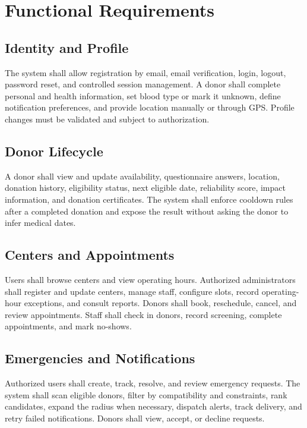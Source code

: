 \section{Functional Requirements}


\subsection{Identity and Profile}
The system shall allow registration by email, email verification, login, logout, password reset, and controlled session management. A donor shall complete personal and health information, set blood type or mark it unknown, define notification preferences, and provide location manually or through GPS. Profile changes must be validated and subject to authorization.

\subsection{Donor Lifecycle}
A donor shall view and update availability, questionnaire answers, location, donation history, eligibility status, next eligible date, reliability score, impact information, and donation certificates. The system shall enforce cooldown rules after a completed donation and expose the result without asking the donor to infer medical dates.

\subsection{Centers and Appointments}
Users shall browse centers and view operating hours. Authorized administrators shall register and update centers, manage staff, configure slots, record operating-hour exceptions, and consult reports. Donors shall book, reschedule, cancel, and review appointments. Staff shall check in donors, record screening, complete appointments, and mark no-shows.

\subsection{Emergencies and Notifications}
Authorized users shall create, track, resolve, and review emergency requests. The system shall scan eligible donors, filter by compatibility and constraints, rank candidates, expand the radius when necessary, dispatch alerts, track delivery, and retry failed notifications. Donors shall view, accept, or decline requests.

